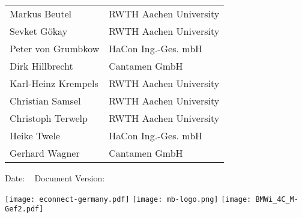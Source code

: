 \begin{titlepage}

\begin{huge}
\bfseries\center
\thistitle

\end{huge}

\vspace{1em}

\begin{large}
\bfseries\noindent
\begin{tabular}{@{}ll@{}}
  Markus Beutel & RWTH Aachen University \\
  Sevket Gökay & RWTH Aachen University \\
  Peter von Grumbkow & HaCon Ing.-Ges. mbH \\
  Dirk Hillbrecht & Cantamen GmbH \\
  Karl-Heinz Krempels & RWTH Aachen University \\
  Christian Samsel & RWTH Aachen University \\
  Christoph Terwelp & RWTH Aachen University \\
  Heike Twele & HaCon Ing.-Ges. mbH \\
  Gerhard Wagner & Cantamen GmbH \\
\end{tabular}

\end{large}

\vspace{2em}

Date: \thisdate ~ Document Version: \thisversion

\vspace{1em}

\thisabstract
\vspace{1em}
\vfill

\texttt{[image: econnect-germany.pdf]} \hspace{1.5em}
\texttt{[image: mb-logo.png]}
\hfill \texttt{[image: BMWi\_4C\_M-Gef2.pdf]}


\end{titlepage}
